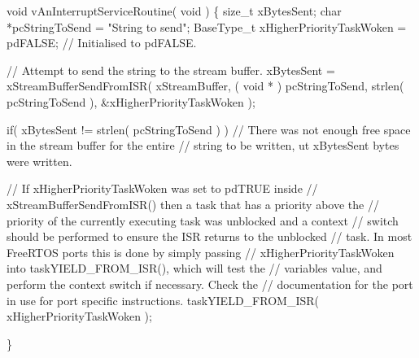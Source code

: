 \begin{DoxyPre}
\begin{DoxyPre}
\begin{DoxyPre}void vAnInterruptServiceRoutine( void )
\{
size\_t xBytesSent;
char *pcStringToSend = "String to send";
BaseType\_t xHigherPriorityTaskWoken = pdFALSE; // Initialised to pdFALSE.
\begin{DoxyVerb}// Attempt to send the string to the stream buffer.
xBytesSent = xStreamBufferSendFromISR( xStreamBuffer,
                                       ( void * ) pcStringToSend,
                                       strlen( pcStringToSend ),
                                       &xHigherPriorityTaskWoken );

if( xBytesSent != strlen( pcStringToSend ) )
{
    // There was not enough free space in the stream buffer for the entire
    // string to be written, ut xBytesSent bytes were written.
}

// If xHigherPriorityTaskWoken was set to pdTRUE inside
// xStreamBufferSendFromISR() then a task that has a priority above the
// priority of the currently executing task was unblocked and a context
// switch should be performed to ensure the ISR returns to the unblocked
// task.  In most FreeRTOS ports this is done by simply passing
// xHigherPriorityTaskWoken into taskYIELD_FROM_ISR(), which will test the
// variables value, and perform the context switch if necessary.  Check the
// documentation for the port in use for port specific instructions.
taskYIELD_FROM_ISR( xHigherPriorityTaskWoken );
\end{DoxyVerb}

\}
\end{DoxyPre}
 \end{DoxyPre}
\end{DoxyPre}
